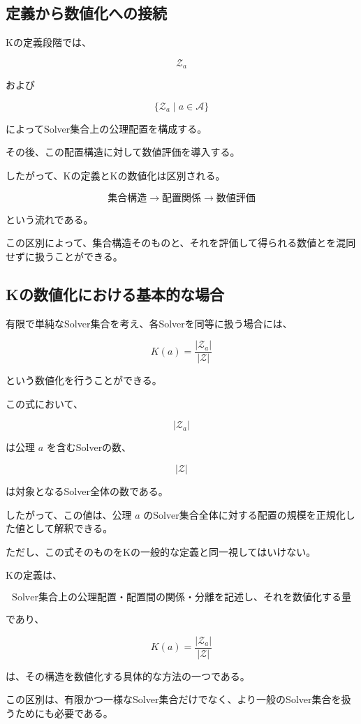 \subsection{定義から数値化への接続}

Kの定義段階では、

\[
\mathcal{Z}_a
\]

および

\[
\{\mathcal{Z}_a\mid a\in\mathcal{A}\}
\]

によってSolver集合上の公理配置を構成する。

その後、この配置構造に対して数値評価を導入する。

したがって、Kの定義とKの数値化は区別される。

\[
\boxed{
\text{集合構造}
\longrightarrow
\text{配置関係}
\longrightarrow
\text{数値評価}
}
\]

という流れである。

この区別によって、集合構造そのものと、それを評価して得られる数値とを混同せずに扱うことができる。

\subsection{Kの数値化における基本的な場合}

有限で単純なSolver集合を考え、各Solverを同等に扱う場合には、

\[
\boxed{
K(a)=\frac{|\mathcal{Z}_a|}{|\mathcal{Z}|}
}
\]

という数値化を行うことができる。

この式において、

\[
|\mathcal{Z}_a|
\]

は公理 $a$ を含むSolverの数、

\[
|\mathcal{Z}|
\]

は対象となるSolver全体の数である。

したがって、この値は、公理 $a$ のSolver集合全体に対する配置の規模を正規化した値として解釈できる。

ただし、この式そのものをKの一般的な定義と同一視してはいけない。

Kの定義は、

\[
\boxed{
\text{Solver集合上の公理配置・配置間の関係・分離を記述し、それを数値化する量}
}
\]

であり、

\[
K(a)=\frac{|\mathcal{Z}_a|}{|\mathcal{Z}|}
\]

は、その構造を数値化する具体的な方法の一つである。

この区別は、有限かつ一様なSolver集合だけでなく、より一般のSolver集合を扱うためにも必要である。

